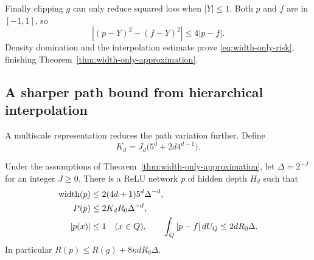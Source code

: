 Finally clipping $g$ can only reduce squared loss when $|Y|\le1$. Both $p$ and $f$ are in $[-1,1]$, so
\[
 |(p-Y)^2-(f-Y)^2|\le4|p-f|.
\]
Density domination and the interpolation estimate prove \eqref{eq:width-only-risk}, finishing Theorem~\ref{thm:width-only-approximation}.

\subsection{A sharper path bound from hierarchical interpolation}
A multiscale representation reduces the path variation further. Define
\[
 K_d=J_d\bigl(5^d+2d4^{d-1}\bigr).
\]

\begin{theorem}
\label{thm:hierarchical-width-only}
Under the assumptions of Theorem~\ref{thm:width-only-approximation}, let $\Delta=2^{-J}$ for an integer $J\ge0$. There is a ReLU network $p$ of hidden depth $H_d$ such that
\begin{align}
 \operatorname{width}(p)&\le2(4d+1)5^d\Delta^{-d},\notag\\
 P(p)&\le2K_d R_0\Delta^{-d},\label{eq:hierarchical-path}\\
 |p(x)|&\le1\quad(x\in Q),\qquad
 \int_Q|p-f|\,dU_Q\le2dR_0\Delta.\notag
\end{align}
In particular $R(p)\le R(g)+8\kappa dR_0\Delta$.
\end{theorem}
